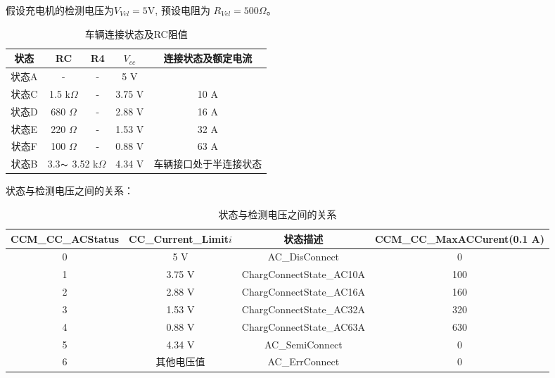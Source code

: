        \begin{example}
         假设充电机的检测电压为$V_{Vel} = 5 \mathrm{V}$, 预设电阻为 $R_{Vel} = 500 \Omega$。
            \begin{table}[H]
                \renewcommand{\arraystretch}{1.3}
                \centering
                \caption{车辆连接状态及RC阻值}
                \begin{tabular}{ccccc}   
                    \toprule
                    状态  & RC  & R4 & $V_{cc}$ & 连接状态及额定电流\\    
                    \midrule
                    状态A  & -  & - & 5 V &   \\
                    状态C  & 1.5 k$\Omega$  & - & 3.75 V &  10 A \\
                    状态D  & 680 $\Omega$  & - &  2.88 V &  16 A  \\
                    状态E  & 220 $\Omega$ & - &   1.53 V &  32 A  \\
                    状态F  & 100 $\Omega$ & - &   0.88 V &  63 A  \\
                    状态B  & \multicolumn{2}{c}{3.3$\thicksim$ 3.52 k$\Omega$} & 4.34 V &车辆接口处于半连接状态\\
                    \bottomrule
                \end{tabular}
                \label{tab:RC2}
            \end{table}

            状态与检测电压之间的关系：
            \begin{table}[H]
                \renewcommand{\arraystretch}{1.3}
                \centering
                \caption{ 状态与检测电压之间的关系}
                \begin{tabular}{cccc}   
                    \toprule
                    CCM\_CC\_ACStatus  &  CC\_Current\_Limit$i$  & 状态描述 & CCM\_CC\_MaxACCurent(0.1 A)\\    
                    \midrule
                    0  &  5 V    &  AC\_DisConnect  & 0 \\
                    1  &  3.75 V &   ChargConnectState\_AC10A & 100\\
                    2  &  2.88 V &   ChargConnectState\_AC16A & 160  \\
                    3  &  1.53 V &   ChargConnectState\_AC32A & 320 \\
                    4  &  0.88 V &   ChargConnectState\_AC63A & 630 \\
                    5  &  4.34 V &   AC\_SemiConnect          &    0\\
                    6  &  其他电压值 & AC\_ErrConnect          & 0\\
                    \bottomrule
                \end{tabular}
                \label{tab:RC3}
            \end{table}
       \end{example}

